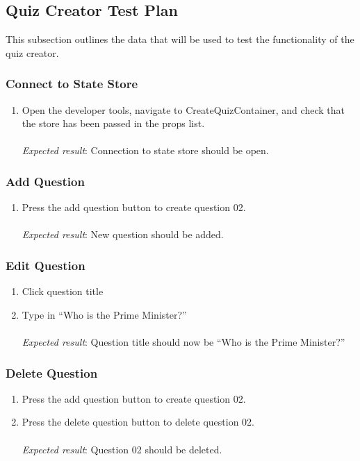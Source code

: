 \subsection{Quiz Creator Test Plan}
This subsection outlines the data that will be used to test the functionality of the quiz creator.

\subsubsection{Connect to State Store} %
\label{ssub:connect_to_state_store}
\begin{enumerate}[leftmargin=*]
\item Open the developer tools, navigate to CreateQuizContainer, and check that the store has been passed in the props list.\\\\
\textit{Expected result}: Connection to state store should be open.
\end{enumerate}

\subsubsection{Add Question}
\begin{enumerate}[leftmargin=*]
\item Press the add question button to create question 02.\\\\
\textit{Expected result}: New question should be added.
\end{enumerate}

\subsubsection{Edit Question}
\begin{enumerate}[leftmargin=*]
\item Click question title
\item Type in ``Who is the Prime Minister?''\\\\
\textit{Expected result}: Question title should now be ``Who is the Prime Minister?''
\end{enumerate}

\subsubsection{Delete Question}
\begin{enumerate}[leftmargin=*]
\item Press the add question button to create question 02.
\item Press the delete question button to delete question 02.\\\\
\textit{Expected result}: Question 02 should be deleted.
\end{enumerate}


